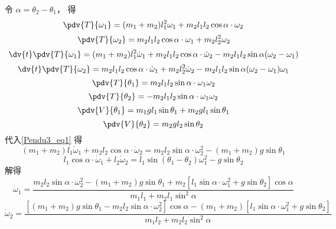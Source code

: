 令 $\alpha = \theta_2-\theta_1$， 得
\begin{equation}
\pdv{T}{\omega_1} = (m_1 + m_2)l_1^2\omega_1 + m_2l_1l_2\cos\alpha\cdot\omega_2
\end{equation}
\begin{equation}
\pdv{T}{\omega_2} = m_2l_1l_2\cos\alpha\cdot\omega_1 + m_2l_2^2\omega_2
\end{equation}
\begin{equation}
\dv{t}\pdv{T}{\omega_1} = (m_1 + m_2)l_1^2\dot\omega_1 + m_2l_1l_2\cos\alpha\cdot\dot\omega_2 - m_2l_1l_2\sin\alpha(\omega_2-\omega_1)
\end{equation}
\begin{equation}
\dv{t}\pdv{T}{\omega_2} = m_2l_1l_2\cos\alpha\cdot\dot\omega_1 + m_2l_2^2\dot\omega_2 -m_2l_1l_2\sin\alpha(\omega_2-\omega_1)\omega_1
\end{equation}
\begin{equation}
\pdv{T}{\theta_1} = m_2l_1l_2\sin\alpha\cdot \omega_1\omega_2
\end{equation}
\begin{equation}
\pdv{T}{\theta_2} = -m_2l_1l_2\sin\alpha\cdot \omega_1\omega_2
\end{equation}
\begin{equation}
\pdv{V}{\theta_1} = m_1gl_1\sin\theta_1 + m_2gl_1\sin\theta_1
\end{equation}
\begin{equation}
\pdv{V}{\theta_2} = m_2gl_2\sin\theta_2
\end{equation}
代入\autoref{Pendu3_eq1} 得
\begin{equation}
(m_1+m_2)l_1\dot\omega_1 + m_2l_2\cos\alpha\cdot\dot\omega_2 = m_2l_2\sin\alpha\cdot\omega_2^2 - (m_1+m_2)g\sin\theta_1
\end{equation}
\begin{equation}
l_1\cos\alpha\cdot\dot\omega_1 + l_2\dot\omega_2 = l_1\sin(\theta_1-\theta_2)\omega_1^2 - g\sin\theta_2
\end{equation}
解得
\begin{equation}
\dot\omega_1 = \frac{m_2l_2\sin\alpha\cdot\omega_2^2 - (m_1+m_2)g\sin\theta_1 + m_2[l_1\sin\alpha\cdot\omega_1^2 + g\sin\theta_2] \cos\alpha}{m_1l_1 + m_2l_1\sin^2\alpha}
\end{equation}
\begin{equation}
\dot\omega_2 = \frac{[(m_1+m_2)g\sin\theta_1 - m_2l_2\sin\alpha\cdot\omega_2^2]\cos\alpha - (m_1+m_2)[l_1\sin\alpha\cdot\omega_1^2 + g\sin\theta_2]}{m_1l_2 + m_2l_2\sin^2\alpha}
\end{equation}


